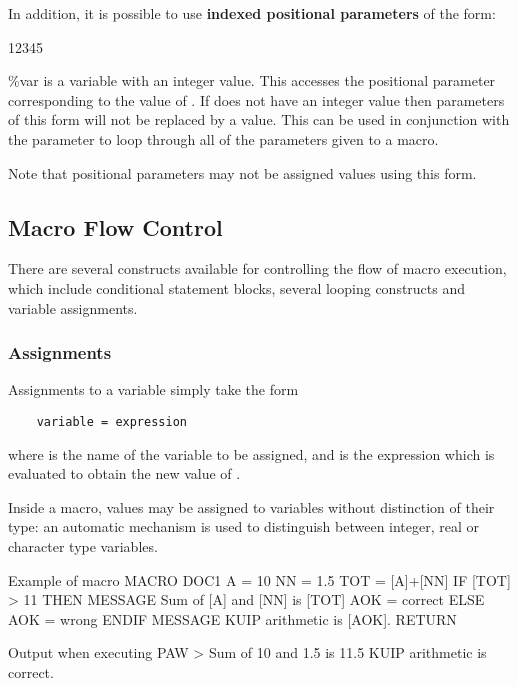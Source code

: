In addition, it is possible to use {\bf indexed positional parameters} 
of the form:                                                      
\begin{DLtt}{12345}
\item[\lsb\%var\rsb]
 is a variable with an integer value. 
This accesses the positional parameter corresponding to the value of . 
If 
does not have an integer value then parameters of this form will not be
replaced by a value. This can be used in conjunction with the parameter \Lit{[\#]}
to loop through all of the parameters given to a macro.
\end{DLtt}
 
Note that positional parameters may not be assigned values using this form.
 
\subsection{Macro Flow Control}

 
There are 
several constructs available for controlling the flow of macro
execution, which include conditional statement blocks, several looping
constructs and variable assignments.
 
\subsubsection*{Assignments}

Assignments to a variable simply take the form
 
\begin{verbatim}
    variable = expression
\end{verbatim}

where  is the name of the variable to be assigned, and 
 is the expression 
which is evaluated to obtain the new value of .
 
Inside a macro, values may be assigned to variables without distinction of their
type: an automatic mechanism is used to distinguish between integer, real or
character type variables. 
 
\begin{XMPin}[.54]{Example of macro}
MACRO DOC1
  A = 10
  NN = 1.5
  TOT = [A]+[NN]
  IF [TOT] > 11 THEN
    MESSAGE Sum of [A] and [NN] is [TOT]
    AOK = correct
  ELSE
    AOK = wrong
  ENDIF
  MESSAGE KUIP arithmetic is [AOK].
RETURN
\end{XMPin}
\begin{XMPout}[.45]{Output when executing}
PAW > 
Sum of 10 and 1.5 is 11.5
KUIP arithmetic is correct.
\end{XMPout}

